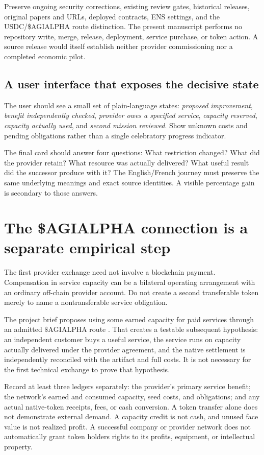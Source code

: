 \documentclass[11pt,letterpaper]{article}
\theoremstyle{remark}\newtheorem{remark}{Remark}[section]
\begin{document}
Preserve ongoing security corrections, existing review gates, historical releases, original papers and URLs, deployed contracts, ENS settings, and the USDC/\$AGIALPHA route distinction. The present manuscript performs no repository write, merge, release, deployment, service purchase, or token action. A source release would itself establish neither provider commissioning nor a completed economic pilot.

\subsection{A user interface that exposes the decisive state}
The user should see a small set of plain-language states: \emph{proposed improvement}, \emph{benefit independently checked}, \emph{provider owes a specified service}, \emph{capacity reserved}, \emph{capacity actually used}, and \emph{second mission reviewed}. Show unknown costs and pending obligations rather than a single celebratory progress indicator.

The final card should answer four questions: What restriction changed? What did the provider retain? What resource was actually delivered? What useful result did the successor produce with it? The English/French journey must preserve the same underlying meanings and exact source identities. A visible percentage gain is secondary to those answers.

\section{The \$AGIALPHA connection is a separate empirical step}
\label{sec:token}
The first provider exchange need not involve a blockchain payment. Compensation in service capacity can be a bilateral operating arrangement with an ordinary off-chain provider account. Do not create a second transferable token merely to name a nontransferable service obligation.

The project brief proposes using some earned capacity for paid services through an admitted $\$\mathrm{AGIALPHA}$ route \citep{brief}. That creates a testable subsequent hypothesis: an independent customer buys a useful service, the service runs on capacity actually delivered under the provider agreement, and the native settlement is independently reconciled with the artifact and full costs. It is not necessary for the first technical exchange to prove that hypothesis.

Record at least three ledgers separately: the provider's primary service benefit; the network's earned and consumed capacity, seed costs, and obligations; and any actual native-token receipts, fees, or cash conversion. A token transfer alone does not demonstrate external demand. A capacity credit is not cash, and unused face value is not realized profit. A successful company or provider network does not automatically grant token holders rights to its profits, equipment, or intellectual property.
\end{document}
